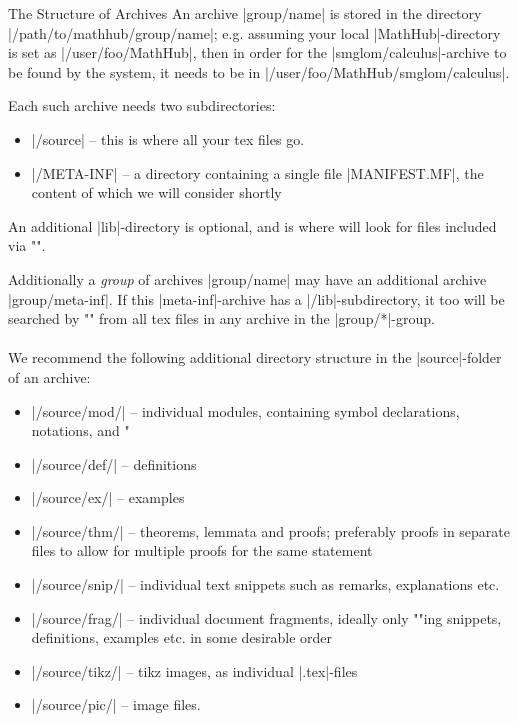 \begin{sfragment}{The Structure of \sTeX Archives}
    An \sTeX archive |group/name| is stored in the
    directory |/path/to/mathhub/group/name|; e.g. assuming your
    local |MathHub|-directory is set as |/user/foo/MathHub|, then
    in order for the |smglom/calculus|-archive to be found by the
    \sTeX system, it needs to be in |/user/foo/MathHub/smglom/calculus|.

    Each such archive needs two subdirectories:
    \begin{itemize}
        \item |/source| -- this is where all your tex files go.
        \item |/META-INF| -- a directory containing a single file
            |MANIFEST.MF|, the content of which we will consider shortly
    \end{itemize}
    An additional |lib|-directory is optional, and is where \sTeX will
    look for files included via \stexcode"\libinput".

    Additionally a \emph{group} of archives |group/name| may have
    an additional archive |group/meta-inf|. If this |meta-inf|-archive
    has a |/lib|-subdirectory, it too will be searched by \stexcode"\libinput"
    from all tex files in any archive in the |group/*|-group.

    \paragraph{} We recommend the following additional directory structure in the
    |source|-folder of an \sTeX archive:
    \begin{itemize}
        \item |/source/mod/| -- individual \sTeX modules, containing
            symbol declarations, notations, and 
            \stexcode"\fi
        \item |/source/def/| -- definitions
        \item |/source/ex/| -- examples
        \item |/source/thm/| -- theorems, lemmata and proofs; preferably
            proofs in separate files to allow for multiple proofs for the
            same statement
        \item |/source/snip/| -- individual text snippets such as remarks,
            explanations etc.
        \item |/source/frag/| -- individual document fragments,
            ideally only \stexcode""ing snippets, definitions,
            examples etc. in some desirable order
        \item |/source/tikz/| -- tikz images, as individual |.tex|-files
        \item |/source/pic/| -- image files.
    \end{itemize}

\end{sfragment}

